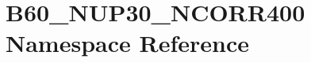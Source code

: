 \hypertarget{namespace_b60___n_u_p30___n_c_o_r_r400}{}\section{B60\+\_\+\+N\+U\+P30\+\_\+\+N\+C\+O\+R\+R400 Namespace Reference}
\label{namespace_b60___n_u_p30___n_c_o_r_r400}
